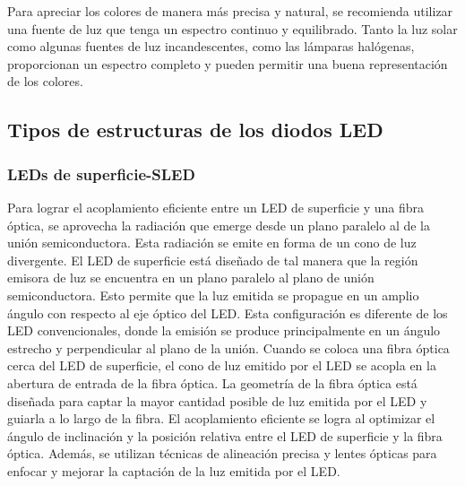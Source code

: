 \documentclass[12pt,fleqn,a4paper,oneside]{LegrandOrangeBook}
\begin{document}
\begin{notation}
Para apreciar los colores de manera más precisa y natural, se recomienda utilizar una fuente de luz que tenga un espectro continuo y equilibrado. Tanto la luz solar como algunas fuentes de luz incandescentes, como las lámparas halógenas, proporcionan un espectro completo y pueden permitir una buena representación de los colores.
\end{notation}
\subsection{Tipos de estructuras de los diodos LED}
\subsubsection{LEDs de superficie-SLED}
Para lograr el acoplamiento eficiente entre un LED de superficie y una fibra óptica, se aprovecha la radiación que emerge desde un plano paralelo al de la unión semiconductora. Esta radiación se emite en forma de un cono de luz divergente. El LED de superficie está diseñado de tal manera que la región emisora de luz se encuentra en un plano paralelo al plano de unión semiconductora. Esto permite que la luz emitida se propague en un amplio ángulo con respecto al eje óptico del LED. Esta configuración es diferente de los LED convencionales, donde la emisión se produce principalmente en un ángulo estrecho y perpendicular al plano de la unión. Cuando se coloca una fibra óptica cerca del LED de superficie, el cono de luz emitido por el LED se acopla en la abertura de entrada de la fibra óptica. La geometría de la fibra óptica está diseñada para captar la mayor cantidad posible de luz emitida por el LED y guiarla a lo largo de la fibra. El acoplamiento eficiente se logra al optimizar el ángulo de inclinación y la posición relativa entre el LED de superficie y la fibra óptica. Además, se utilizan técnicas de alineación precisa y lentes ópticas para enfocar y mejorar la captación de la luz emitida por el LED.
\end{document}
